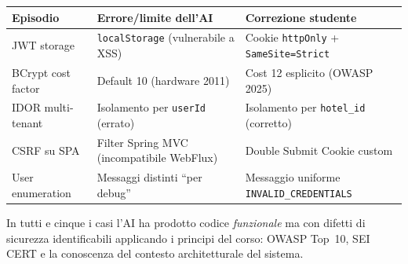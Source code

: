 ﻿\documentclass[a4paper,12pt]{report}
\begin{document}
\begin{center}
\small
\begin{tabular}{p{2.8cm} p{4.5cm} p{4.5cm}}
\toprule
\textbf{Episodio} & \textbf{Errore/limite dell'AI} & \textbf{Correzione studente} \\
\midrule
JWT storage
  & \texttt{localStorage} (vulnerabile a XSS)
  & Cookie \texttt{httpOnly} + \texttt{SameSite=Strict} \\
BCrypt cost factor
  & Default 10 (hardware 2011)
  & Cost 12 esplicito (OWASP 2025) \\
IDOR multi-tenant
  & Isolamento per \texttt{userId} (errato)
  & Isolamento per \texttt{hotel\_id} (corretto) \\
CSRF su SPA
  & Filter Spring MVC (incompatibile WebFlux)
  & Double Submit Cookie custom \\
User enumeration
  & Messaggi distinti ``per debug''
  & Messaggio uniforme \texttt{INVALID\_CREDENTIALS} \\
\bottomrule
\end{tabular}
\end{center}

In tutti e cinque i casi l'AI ha prodotto codice \emph{funzionale} ma con difetti
di sicurezza identificabili applicando i principi del corso: OWASP Top~10, SEI CERT
e la conoscenza del contesto architetturale del sistema.
\end{document}

